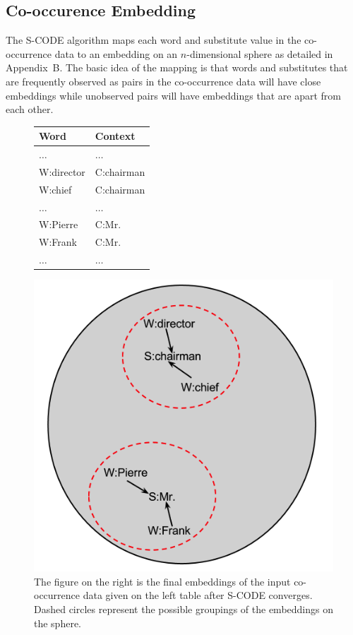 \subsection{Co-occurence Embedding}
\label{sec:embedding}
The S-CODE algorithm maps each word and substitute value in the
co-occurrence data to an embedding on an $n$-dimensional sphere as
detailed in Appendix~B.  The basic idea of the mapping is that words
and substitutes that are frequently observed as pairs in the
co-occurrence data will have close embeddings while unobserved pairs
will have embeddings that are apart from each other.
\begin{figure}[ht]
\centering
  \begin{minipage}[c]{0.38\textwidth}
    \begin{tabular}{|l|l|}
    \hline
    \textbf{Word} & \textbf{Context} \\
    \hline
    $\hdots$&$\hdots$\\
    W:director & C:chairman \\
    W:chief & C:chairman \\
    $\hdots$&$\hdots$\\
    W:Pierre & C:Mr. \\
    W:Frank & C:Mr. \\
    $\hdots$&$\hdots$\\
    \hline
  \end{tabular}
  \end{minipage}
  \begin{minipage}[c]{0.48\textwidth}
    \includegraphics[height=\textwidth]{scode-ex.png}
  \end{minipage}
  \caption{The figure on the right is the final embeddings of the
    input co-occurrence data given on the left table after S-CODE
    converges.  Dashed circles represent the possible groupings of the
    embeddings on the sphere.}
  \label{fig:scodeexample}
\end{figure}

